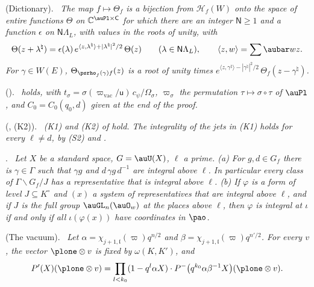 \documentclass[10pt]{amsart}
\theoremstyle{definition}
\theoremstyle{remark}
\newcommand{\C}{\mathbb C}
\providecommand{\psHS}{\mathcal H}
\newenvironment{quotedthm}[2]{\par\medskip\noindent\begingroup
  \textbf{#1}#2.\ \itshape\ignorespaces}{\endgroup\par\medskip}
\begin{document}
\begin{quotedthm}{\cite[Lemma~5.26]{P49}}{ (Dictionary)}
The map $f\mapsto\Theta_f$ is a bijection from $\psHS_f(W)$ onto the space of entire functions
$\Theta$ on $\C^{\auPl\times\mathsf C}$ for which there are an integer $\mathsf N\ge1$ and a function
$\epsilon$ on $\mathsf N\Lambda_L$, with values in the roots of unity, with
\[
\Theta(z+\lambda^\natural)=\epsilon(\lambda)\,e^{\langle z,\lambda^\natural\rangle+|\lambda^\natural|^2
/2}\,\Theta(z)\qquad(\lambda\in\mathsf N\Lambda_L),\qquad\langle z,w\rangle=\sum\aubar w z .
\]
For $\gamma\in W(E)$, $\Theta_{\psrho_f(\gamma)f}(z)$ is a root of unity times
$e^{\langle z,\gamma^\natural\rangle-|\gamma^\natural|^2/2}\,\Theta_f(z-\gamma^\natural)$.
\end{quotedthm}

\begin{quotedthm}{\cite[Proposition~5.27]{P49}}{ ({\cite[Lemma~5.7]{P49}})}
{\cite[Lemma~5.7]{P49}} holds, with
$t_\sigma=\sigma(\varpi_{\mathrm{vac}}/\mathsf u)\,c_\psi/\Omega_\sigma$, $\varpi_\sigma$ the
permutation $\tau\mapsto\sigma\circ\tau$ of $\auPl$, and $C_0=C_0(q_0,d)$ given at the end of the proof.
\end{quotedthm}

\begin{quotedthm}{\cite[Proposition~5.30]{P49}}{ ({\cite[Lemma~4.13(K1)]{P49}}, (K2))}
{\rm(K1)} and {\rm(K2)} of {\cite[Lemma~4.13]{P49}} hold.
The integrality of the jets in (K1) holds for every $\ell\ne d$, by (S2) and {\cite[Theorem~7.15]{P49}}.
\end{quotedthm}

\begin{quotedthm}{\cite[Corollary~6.4]{P49}}{}
Let $X$ be a standard space, $G=\auU(X)$, $\ell$ a prime.
{\rm(a)} For $g,d\in G_f$ there is $\gamma\in\Gamma$ such that $\gamma g$ and $d\,\gamma g\,d^{-1}$
are integral above $\ell$. In particular every class of $\Gamma\backslash G_f/J$ has a
representative that is integral above $\ell$.
{\rm(b)} If $\varphi$ is a form of level $J\subseteq K^\circ$ and $(x)$ a system of representatives
that are integral above $\ell$, and if $J$ is the full group $\auGL_n(\auO_w)$ at the places above
$\ell$, then $\varphi$ is integral at $\iota$ if and only if all $\iota(\varphi(x))$ have
coordinates in $\pao$.
\end{quotedthm}

\begin{quotedthm}{\cite[Lemma~6.8]{P49}}{ (The vacuum)}
Let $\alpha=\chi_{j+1,\mathfrak l}(\varpi)q^{n/2}$ and $\beta=\chi_{j+1,\mathfrak l}(\varpi)
q^{n'/2}$. For every $v$, the vector $\plone\otimes v$ is fixed by $\omega(K,K')$, and
\[
P'(X)(\plone\otimes v)=\prod_{l<k_0}(1-q^l\alpha X)\cdot P^-\bigl(q^{k_0}\alpha\beta^{-1}X\bigr)
(\plone\otimes v).
\]
\end{quotedthm}
\end{document}
